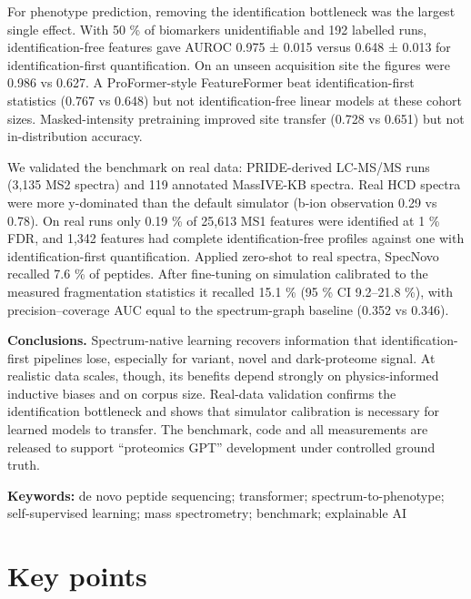 \documentclass[
]{article}
\begin{document}
For phenotype prediction, removing the identification bottleneck was the
largest single effect. With 50 \% of biomarkers unidentifiable and 192
labelled runs, identification-free features gave AUROC 0.975 ± 0.015
versus 0.648 ± 0.013 for identification-first quantification. On an
unseen acquisition site the figures were 0.986 vs 0.627. A
ProFormer-style FeatureFormer beat identification-first statistics
(0.767 vs 0.648) but not identification-free linear models at these
cohort sizes. Masked-intensity pretraining improved site transfer (0.728
vs 0.651) but not in-distribution accuracy.

We validated the benchmark on real data: PRIDE-derived LC-MS/MS runs
(3,135 MS2 spectra) and 119 annotated MassIVE-KB spectra. Real HCD
spectra were more y-dominated than the default simulator (b-ion
observation 0.29 vs 0.78). On real runs only 0.19 \% of 25,613 MS1
features were identified at 1 \% FDR, and 1,342 features had complete
identification-free profiles against one with identification-first
quantification. Applied zero-shot to real spectra, SpecNovo recalled 7.6
\% of peptides. After fine-tuning on simulation calibrated to the
measured fragmentation statistics it recalled 15.1 \% (95 \% CI
9.2--21.8 \%), with precision--coverage AUC equal to the spectrum-graph
baseline (0.352 vs 0.346).

\textbf{Conclusions.} Spectrum-native learning recovers information that
identification-first pipelines lose, especially for variant, novel and
dark-proteome signal. At realistic data scales, though, its benefits
depend strongly on physics-informed inductive biases and on corpus size.
Real-data validation confirms the identification bottleneck and shows
that simulator calibration is necessary for learned models to transfer.
The benchmark, code and all measurements are released to support
``proteomics GPT'' development under controlled ground truth.

\textbf{Keywords:} de novo peptide sequencing; transformer;
spectrum-to-phenotype; self-supervised learning; mass spectrometry;
benchmark; explainable AI

\hypertarget{key-points}{%
\section{Key points}\label{key-points}}
\end{document}
